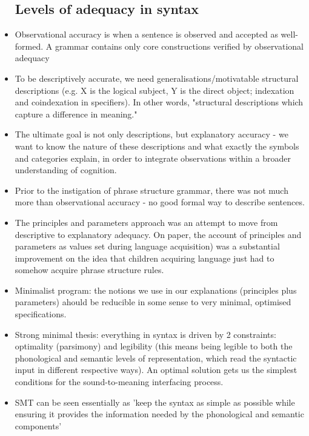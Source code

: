 \documentclass{article}
\begin{document}
\begin{itemize}
    \subsection{Levels of adequacy in syntax}
    \item Observational accuracy is when a sentence is observed and accepted as well-formed. A grammar contains only core constructions verified by observational adequacy 
    \item To be descriptively accurate, we need generalisations/motivatable structural descriptions (e.g. X is the logical subject, Y is the direct object; indexation and coindexation in specifiers). In other words, "structural descriptions which capture a difference in meaning."
    \item The ultimate goal is not only descriptions, but explanatory accuracy - we want to know the nature of these descriptions and what exactly the symbols and categories explain, in order to integrate observations within a broader understanding of cognition.
    \item Prior to the instigation of phrase structure grammar, there was not much more than observational accuracy - no good formal way to describe sentences.
    \item The principles and parameters approach was an attempt to move from descriptive to explanatory adequacy. On paper, the account of principles and parameters as values set during language acquisition) was a substantial improvement on the idea that children acquiring language just had to somehow acquire phrase structure rules.
    \item Minimalist program: the notions we use in our explanations (principles plus parameters) ahould be reducible in some sense to very minimal, optimised specifications.
    \item Strong minimal thesis: everything in syntax is driven by 2 constraints: optimality (parsimony) and legibility (this means being legible to both the phonological and semantic levels of representation, which read the syntactic input in different respective ways). An optimal solution gets us the simplest conditions for the sound-to-meaning interfacing process.
    \item SMT can be seen essentially as 'keep the syntax as simple as possible while ensuring it provides the information needed by the phonological and semantic components'

\end{itemize}
\end{document}
